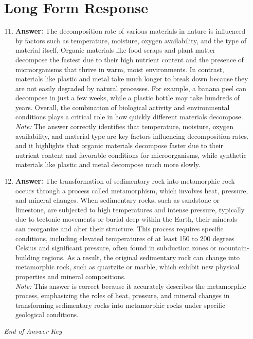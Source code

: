 \documentclass[12pt]{article}
\begin{document}
\section*{Long Form Response}
\begin{enumerate}[label=\arabic*.]
\setcounter{enumi}{10}
\item \textbf{Answer:} The decomposition rate of various materials in nature is influenced by factors such as temperature, moisture, oxygen availability, and the type of material itself. Organic materials like food scraps and plant matter decompose the fastest due to their high nutrient content and the presence of microorganisms that thrive in warm, moist environments. In contrast, materials like plastic and metal take much longer to break down because they are not easily degraded by natural processes. For example, a banana peel can decompose in just a few weeks, while a plastic bottle may take hundreds of years. Overall, the combination of biological activity and environmental conditions plays a critical role in how quickly different materials decompose.
\\ \textit{Note:} The answer correctly identifies that temperature, moisture, oxygen availability, and material type are key factors influencing decomposition rates, and it highlights that organic materials decompose faster due to their nutrient content and favorable conditions for microorganisms, while synthetic materials like plastic and metal decompose much more slowly.
\item \textbf{Answer:} The transformation of sedimentary rock into metamorphic rock occurs through a process called metamorphism, which involves heat, pressure, and mineral changes. When sedimentary rocks, such as sandstone or limestone, are subjected to high temperatures and intense pressure, typically due to tectonic movements or burial deep within the Earth, their minerals can reorganize and alter their structure. This process requires specific conditions, including elevated temperatures of at least 150 to 200 degrees Celsius and significant pressure, often found in subduction zones or mountain-building regions. As a result, the original sedimentary rock can change into metamorphic rock, such as quartzite or marble, which exhibit new physical properties and mineral compositions.
\\ \textit{Note:} This answer is correct because it accurately describes the metamorphic process, emphasizing the roles of heat, pressure, and mineral changes in transforming sedimentary rocks into metamorphic rocks under specific geological conditions.
\end{enumerate}

\vfill
\noindent\textit{End of Answer Key}
\end{document}
